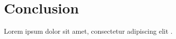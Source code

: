 \chapter{Conclusion}

Lorem ipsum dolor sit amet, consectetur adipiscing elit \cite{paolo24satellite}.